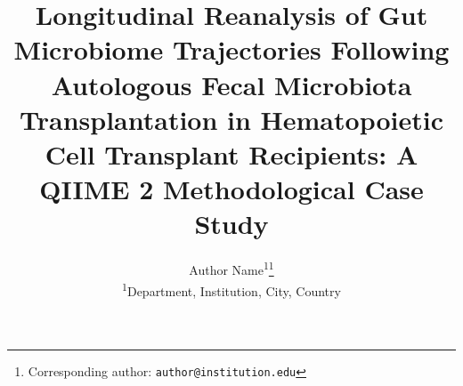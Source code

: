 
\renewcommand{\headeright}{Preprint}
\renewcommand{\undertitle}{Preprint}
\renewcommand{\shorttitle}{Longitudinal Reanalysis of Auto-FMT Microbiome Trajectories}

\title{Longitudinal Reanalysis of Gut Microbiome Trajectories Following Autologous Fecal Microbiota Transplantation in Hematopoietic Cell Transplant Recipients: A QIIME 2 Methodological Case Study}

\author{
  Author Name\textsuperscript{1}\thanks{Corresponding author: \texttt{author@institution.edu}} \\[2pt]
  \textsuperscript{1}Department, Institution, City, Country
}

\date{}   %
\maketitle
